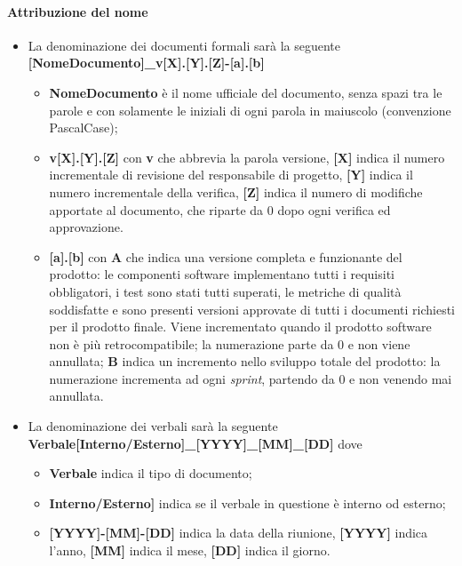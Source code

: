 \paragraph{Attribuzione del nome}
\begin{itemize}
	\item La denominazione dei documenti formali sarà la seguente \newline
	\textbf{[NomeDocumento]\_v[X].[Y].[Z]-[a].[b]}
	\begin{itemize}
		\item \textbf{NomeDocumento} è il nome ufficiale del documento, senza spazi tra le parole e con solamente le iniziali di ogni parola in maiuscolo (convenzione PascalCase);
		\item \textbf{v[X].[Y].[Z]} con \textbf{v} che abbrevia la parola versione, \textbf{[X]} indica il numero incrementale di revisione del responsabile di progetto, \textbf{[Y]} indica il numero incrementale della verifica, \textbf{[Z]} indica il numero di modifiche apportate al documento, che riparte da 0 dopo ogni verifica ed approvazione.
		\item \textbf{[a].[b]} con \textbf{A} che indica una versione completa e funzionante del prodotto: le componenti software
implementano tutti i requisiti obbligatori, i test sono stati tutti superati, le metriche di qualità soddisfatte e sono presenti versioni approvate di tutti i documenti richiesti per il prodotto finale. Viene incrementato quando il prodotto software non è più retrocompatibile; la numerazione parte da 0 e non viene annullata; \textbf{B} indica un incremento nello sviluppo totale del prodotto: la numerazione incrementa ad ogni \textit{sprint}, partendo da 0 e non venendo mai annullata.
	\end{itemize}
	\item La denominazione dei verbali sarà la seguente\newline
	\textbf{Verbale[Interno/Esterno]\_[YYYY]\_[MM]\_[DD]}\newline
	dove
	\begin{itemize}
		\item \textbf{Verbale} indica il tipo di documento;
		\item \textbf{Interno/Esterno]} indica se il verbale in questione è interno od esterno;
		\item \textbf{[YYYY]-[MM]-[DD]} indica la data della riunione, \textbf{[YYYY]} indica l'anno, \textbf{[MM]} indica il mese, \textbf{[DD]} indica il giorno.
	\end{itemize}
\end{itemize}
